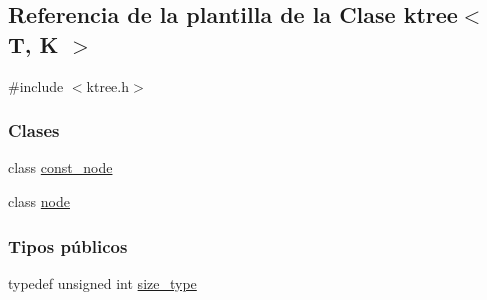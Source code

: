 \hypertarget{classktree}{}\subsection{Referencia de la plantilla de la Clase ktree$<$ T, K $>$}
\label{classktree}


{\ttfamily \#include $<$ktree.\+h$>$}

\subsubsection*{Clases}
\begin{DoxyCompactItemize}
\item 
class \hyperlink{classktree_1_1const__node}{const\+\_\+node}
\item 
class \hyperlink{classktree_1_1node}{node}
\end{DoxyCompactItemize}
\subsubsection*{Tipos públicos}
\begin{DoxyCompactItemize}
\item 
typedef unsigned int \hyperlink{classktree_ac0f325d73a32ea75b8d09579c2085566}{size\+\_\+type}
\end{DoxyCompactItemize}
